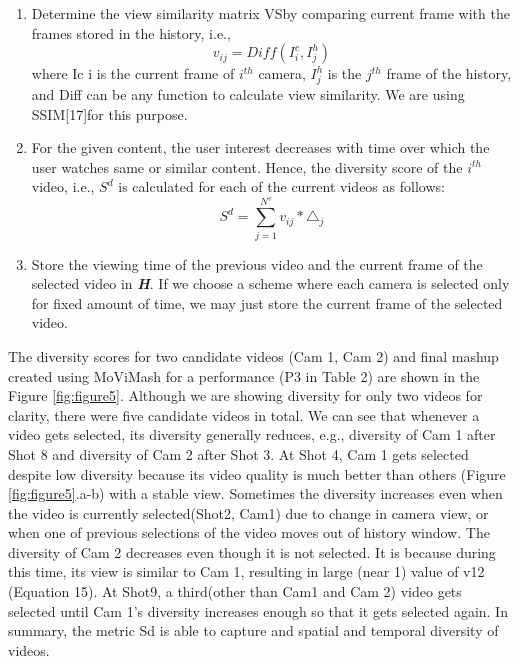 \documentclass{sig-alternate}
\begin{document}
\begin{enumerate}
\item Determine the view similarity matrix VSby comparing current frame with the frames stored in the history, i.e.,
\begin{equation}
 v_{ij} = Diff(I^c_i ,I^h_j) 
\end{equation} where Ic i is the current frame of \(i^{th}\) camera, \(I^h_j\) is the \(j^{th}\) frame of the history, and Diff can be any function to calculate view similarity. We are using SSIM[17]for this purpose.
\item  For the given content, the user interest decreases with time over which the user watches same or similar content. Hence, the diversity score of the \(i^{th}\) video, i.e., \(S^d\) is calculated for each of the current videos as follows:
\begin{equation}
S^d = \sum_{j=1}^{N^v}v_{ij} * \triangle_j
\end{equation}
\item Store the viewing time of the previous video and the current frame of the selected video in \textbf{\textit{H}}. If we choose a scheme where each camera is selected only for fixed amount of time, we may just store the current frame of the selected video.
\end{enumerate}

The diversity scores for two candidate videos (Cam 1, Cam 2) and final mashup created using MoViMash for a performance (P3 in Table 2) are shown in the Figure \ref{fig:figure5}. Although we are showing diversity for only two videos for clarity, there were ﬁve candidate videos in total. We can see that whenever a video gets selected, its diversity generally reduces, e.g., diversity of Cam 1 after Shot 8 and diversity of Cam 2 after Shot 3. At Shot 4, Cam 1 gets selected despite low diversity because its video quality is much better than others (Figure \ref{fig:figure5}.a-b) with a stable view. Sometimes the diversity increases even when the video is currently selected(Shot2, Cam1) due to change in camera view, or when one of previous selections of the video moves out of history window. The diversity of Cam 2 decreases even though it is not selected. It is because during this time, its view is similar to Cam 1, resulting in large (near 1) value of v12 (Equation 15). At Shot9, a third(other than Cam1 and Cam 2) video gets selected until Cam 1's diversity increases enough so that it gets selected again. In summary, the metric Sd is able to capture and spatial and temporal diversity of videos. 
\end{document}
